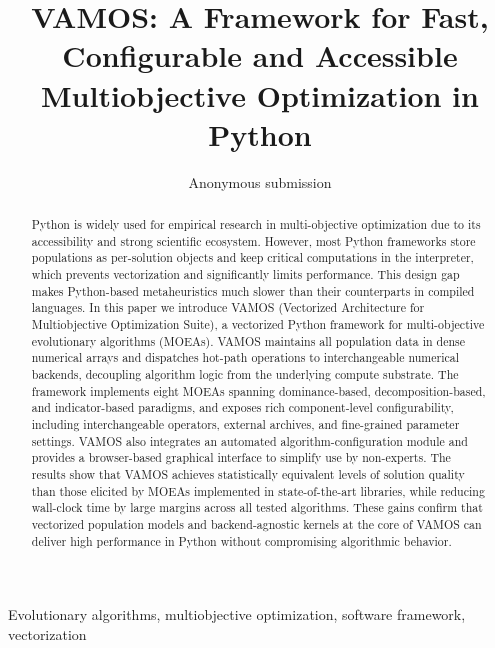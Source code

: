\documentclass[journal]{IEEEtran}
\title{VAMOS: A Framework for Fast, Configurable and Accessible Multiobjective Optimization in Python}
\author{Anonymous submission}
\begin{document}
\maketitle

\begin{abstract}
Python is widely used for empirical research in multi-objective optimization due to its accessibility and strong scientific ecosystem. However, most Python frameworks store populations as per-solution objects and keep critical computations in the interpreter, which prevents vectorization and significantly limits performance. This design gap makes Python-based metaheuristics much slower than their counterparts in compiled languages. In this paper we introduce VAMOS (Vectorized Architecture for Multiobjective Optimization Suite), a vectorized Python framework for multi-objective evolutionary algorithms (MOEAs). VAMOS maintains all population data in dense numerical arrays and dispatches hot-path operations to interchangeable numerical backends, decoupling algorithm logic from the underlying compute substrate. The framework implements eight MOEAs spanning dominance-based, decomposition-based, and indicator-based paradigms, and exposes rich component-level configurability, including interchangeable operators, external archives, and fine-grained parameter settings. VAMOS also integrates an automated algorithm-configuration module and provides a browser-based graphical interface to simplify use by non-experts. The results show that VAMOS achieves statistically equivalent levels of solution quality than those elicited by MOEAs implemented in state-of-the-art libraries, while reducing wall-clock time by large margins across all tested algorithms. These gains confirm that vectorized population models and backend-agnostic kernels at the core of VAMOS can deliver high performance in Python without compromising algorithmic behavior.
\end{abstract}

\begin{IEEEkeywords}
Evolutionary algorithms, multiobjective optimization, software framework, vectorization
\end{IEEEkeywords}
\end{document}
